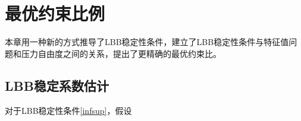 \chapter{最优约束比例}
本章用一种新的方式推导了LBB稳定性条件，建立了LBB稳定性条件与特征值问题和压力自由度之间的关系，提出了更精确的最优约束比。
\section{LBB稳定系数估计}
对于LBB稳定性条件\eqref{infsup}，假设
